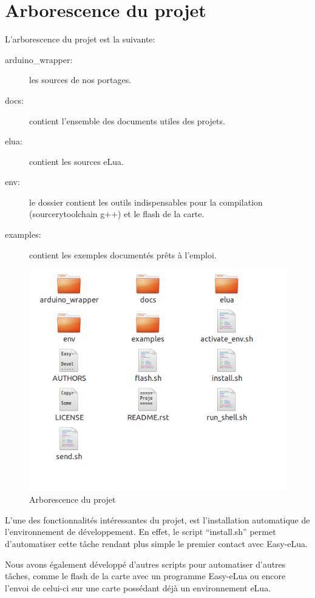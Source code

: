 \chapter[Arborescence du projet]{Arborescence du projet}
\label{chap:chap7}

L'arborescence du projet est la suivante:

\begin{description}
 \item[arduino\_wrapper: ] les sources de nos portages.
 \item[docs: ] contient l’ensemble des documents utiles des projets.
 \item[elua: ] contient les sources eLua.
 \item[env: ] le dossier contient les outils indispensables pour la compilation (sourcerytoolchain g++) et le flash de la carte.
 \item[examples: ] contient les exemples documentés prêts à l’emploi.
\end{description}
 
\begin{figure}[h]
\begin{center}
\includegraphics[scale=0.6]{figure/arborescence.png}
\caption{Arborescence du projet}
\end{center}
\end{figure}

L’une des fonctionnalités intéressantes du projet, est l’installation automatique de l’environnement de développement. 
En effet, le script ``install.sh'' permet d’automatiser cette tâche rendant plus simple le premier contact avec Easy-eLua.

Nous avons également développé d’autres scripts pour automatiser d’autres tâches, comme le flash de la carte avec un programme 
Easy-eLua ou encore l’envoi de celui-ci sur une carte possédant déjà un environnement eLua.